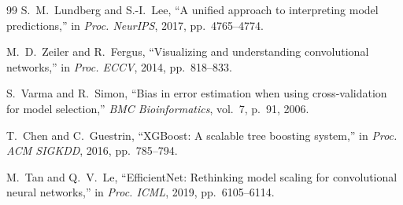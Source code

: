 \documentclass[conference]{IEEEtran}
\begin{document}
\begin{thebibliography}{99}
S.~M.~Lundberg and S.-I.~Lee, ``A unified approach to interpreting model predictions,'' in \emph{Proc. NeurIPS}, 2017, pp.~4765--4774.

M.~D.~Zeiler and R.~Fergus, ``Visualizing and understanding convolutional networks,'' in \emph{Proc. ECCV}, 2014, pp.~818--833.

S.~Varma and R.~Simon, ``Bias in error estimation when using cross-validation for model selection,'' \emph{BMC Bioinformatics}, vol.~7, p.~91, 2006.

T.~Chen and C.~Guestrin, ``XGBoost: A scalable tree boosting system,'' in \emph{Proc. ACM SIGKDD}, 2016, pp.~785--794.

M.~Tan and Q.~V.~Le, ``EfficientNet: Rethinking model scaling for convolutional neural networks,'' in \emph{Proc. ICML}, 2019, pp.~6105--6114.

\end{thebibliography}
\end{document}

